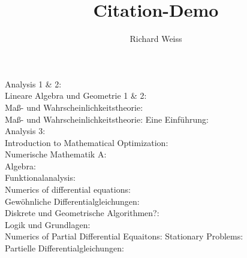 \documentclass{article}
\title
{
  Citation-Demo
}
\author
{
    Richard Weiss
}
\date{}
\begin{document}
\maketitle

Analysis 1 \& 2:
\cite{Ana1&2} \\

Lineare Algebra und Geometrie 1 \& 2:
\cite{LinAG1&2} \\

Ma{\ss}- und Wahrscheinlichkeitstheorie:
\cite{MassWHT1&2} \\

Ma{\ss}- und Wahrscheinlichkeitstheorie: Eine Einf{\"u}hrung:
\cite{kusolitsch2014maß} \\

Analysis 3:
\cite{Ana3} \\

Introduction to Mathematical Optimization:
\cite{EOpt} \\

Numerische Mathematik A:
\cite{NumA} \\

Algebra:
\cite{Alg1&2} \\

Funktionalanalysis:
\cite{FAna1} \\

Numerics of differential equations:
\cite{NumODEs} \\

Gew{\"o}hnliche Differentialgleichungen:
\cite{ODEs} \\

Diskrete und Geometrische Algorithmen?:
\cite{DGA} \\

Logik und Grundlagen:
\cite{LGM} \\

Numerics of Partial Differential Equaitons: Stationary Problems:
\cite{NumPDEs} \\

Partielle Differentialgleichungen:
\cite{PDEs} \\

\newpage

\printbibliography
\end{document}
